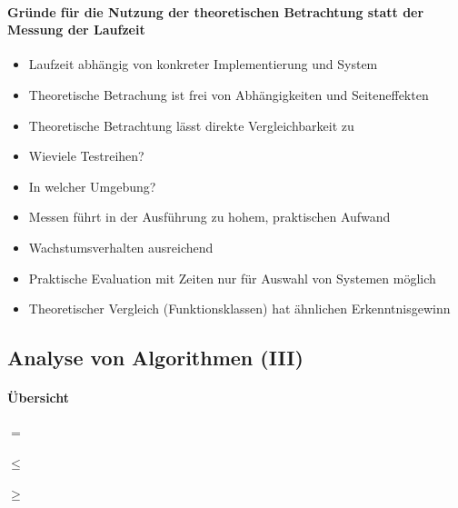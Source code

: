 \documentclass[
    ngerman,
    color=3b,
    dark_mode,
    load_common, %
    summary,
    boxarc,
]{rubos-tuda-template}
\begin{document}
\paragraph{Gründe für die Nutzung der theoretischen Betrachtung statt der Messung der Laufzeit }
\begin{description}[itemsep=1em]
    \item [Vergleichbarkeit]
          \begin{itemize}
              \item Laufzeit abhängig von konkreter Implementierung und System
              \item Theoretische Betrachung ist frei von Abhängigkeiten und Seiteneffekten
              \item Theoretische Betrachtung lässt direkte Vergleichbarkeit zu
          \end{itemize}

    \item [Aufwand]
          \begin{itemize}
              \item Wieviele Testreihen?
              \item In welcher Umgebung?
              \item Messen führt in der Ausführung zu hohem, praktischen Aufwand
          \end{itemize}

    \item [Komplexitätsfunktion]
          \begin{itemize}
              \item Wachstumsverhalten ausreichend
              \item Praktische Evaluation mit Zeiten nur für Auswahl von Systemen möglich
              \item Theoretischer Vergleich (Funktionsklassen) hat ähnlichen Erkenntnisgewinn
          \end{itemize}
\end{description}
\clearpage
\subsection{Analyse von Algorithmen \textmd{(III)}}\label{Analyse von Algorithmen 3}
\paragraph{Übersicht}\mbox{}
\begin{description}[leftmargin=2cm]
    \item [$\Theta$] $=$
    \item [$\mathcal{O}$] $\leq$
    \item [$\Omega$] $\geq$
\end{description}
\end{document}

